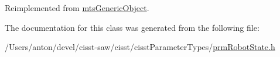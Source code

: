 Reimplemented from \hyperlink{classmts_generic_object_a2030aaa58bc215eccce1dc8d20dd0fdc}{mts\+Generic\+Object}.



The documentation for this class was generated from the following file\+:\begin{DoxyCompactItemize}
\item 
/\+Users/anton/devel/cisst-\/saw/cisst/cisst\+Parameter\+Types/\hyperlink{prm_robot_state_8h}{prm\+Robot\+State.\+h}\end{DoxyCompactItemize}
